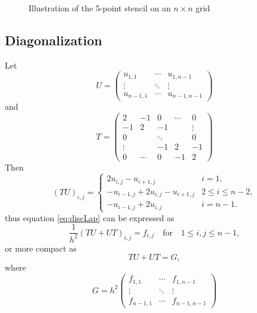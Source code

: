 \documentclass[11pt,a4paper,english]{article}
\numberwithin{figure}{subsection}
\numberwithin{table}{subsection}
\begin{document}
\begin{figure}[h]
\centering
{}
\caption{Illustration of the 5-point stencil on an $n\times n$ grid}
\label{fig:grid}
\end{figure}

\subsection{Diagonalization}
Let 
\begin{equation}
	U = \begin{pmatrix}
	u_{1,1} & \cdots & u_{1,n-1} \\
	\vdots & \ddots& \vdots \\
	u_{n-1,1} & \cdots & u_{n-1,n-1}
	\end{pmatrix}
\end{equation}
and
\begin{equation}
	\label{eq:Tmatrix}
	T = \begin{pmatrix}
	2		&	-1		&	0		&	\cdots	&	0		\\
	-1		&	2		&	-1		&			&	\vdots	\\
	0		&			&	\ddots	&			&	0		\\
	\vdots	&			&		-1	&	2		&	-1		\\
	0		&	\cdots	&	0		&	-1		&	2	
	\end{pmatrix}
\end{equation}
Then
\begin{equation}
	(TU)_{i,j} = \begin{cases}  2u_{i,j} - u_{i+1,j} & i = 1, \\
	-u_{i-1,j} + 2u_{i,j} - u_{i+1,j}  & 2 \leq i \leq n-2, \\
	-u_{i-1,j} + 2u_{i,j}  & i = n-1.
	\end{cases}
\end{equation}
thus equation \eqref{eq:discLap} can be expressed as
\[
	\frac{1}{h^2}(TU+UT)_{i,j} = f_{i,j} \quad \text{for} \quad 1\leq i,j \leq n-1,
\]
or more compact as
\begin{equation}
	\label{eq:TUUTG}
	TU+UT = G,
\end{equation}
where
\begin{equation*}
	G = h^2\begin{pmatrix}
	f_{1,1} 	& \cdots	& f_{1,n-1} \\
	\vdots		& \ddots	& \vdots \\
	f_{n-1,1}	& \cdots	& f_{n-1,n-1}
	\end{pmatrix}
\end{equation*}
\end{document}
